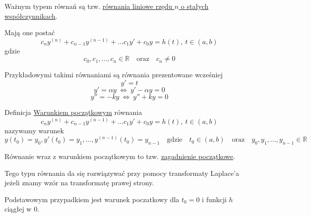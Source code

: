 Ważnym typem równań są tzw. \underline{równania liniowe rzędu $n$ o stałych współczynnikach}.

Mają one postać
\[ c_n y^{(n)} + c_{n - 1} y^{(n - 1)} + ... c_1 y' + c_0 y = h(t), \ t \in (a,b) \]
gdzie
\[ c_0, c_1, ..., c_n \in \mathbb{R} \quad \text{oraz} \quad c_n \neq 0 \]
\bigskip

Przykładowymi takimi równaniami są równania prezentowane wcześniej
\[ y' = t \]
\[ y' = \alpha y \ \Leftrightarrow \ y' - \alpha y = 0 \]
\[ y'' = -ky \ \Leftrightarrow \ y'' + ky = 0 \]
\medskip

\begin{tw}{Definicja}
    \underline{Warunkiem początkowym} równania
    \[ c_n y^{(n)} + c_{n - 1} y^{(n - 1)} + ... c_1 y' + c_0 y = h(t), \ t \in (a,b) \]
    nazywamy warunek
    \[ y(t_0) = y_0, y'(t_0) = y_1, ..., y^{(n - 1)}(t_0) = y_{n - 1} \quad \text{gdzie} \quad t_0 \in (a,b) \quad \text{oraz} \quad y_0, y_1, ..., y_{n - 1} \in \mathbb{R} \] 
    
    Równanie wraz z warunkiem początkowym to tzw. \underline{zagadnienie początkowe}.
\end{tw}

Tego typu równania da się rozwiązywać przy pomocy transformaty Laplace'a jeżeli znamy wzór na transformatę prawej strony.

Podstawowym przypadkiem jest warunek poczatkowy dla $ t_0 = 0 $ i funkcji $h$ ciągłej w 0.